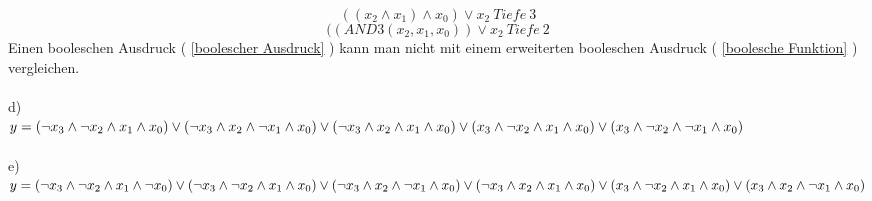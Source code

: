 \documentclass[11pt,a4paper]{article}
\begin{document}
\begin{equation}
\label{boolescher Ausdruck}
(( x_2 \wedge x_1 ) \wedge x_0 ) \vee x_2~Tiefe~3
\end{equation}
\begin{equation}
\label{boolesche Funktion}
((AND3(x_2,x_1,x_0))\vee x_2~Tiefe~2
\end{equation}
Einen booleschen Ausdruck ( \ref{boolescher Ausdruck} ) kann man nicht mit einem erweiterten booleschen Ausdruck  ( \ref{boolesche Funktion} ) vergleichen. \\ \\
d)\\
$
y=( \neg x_3 \wedge \neg x_2 \wedge x_1 \wedge x_0) \vee  ( \neg x_3 \wedge x_2 \wedge \neg x_1 \wedge x_0 ) \vee  ( \neg x_3 \wedge x_2 \wedge x_1 \wedge x_0  ) \vee \\
( x_3 \wedge \neg x_2 \wedge x_1 \wedge x_0 ) \vee ( x_3 \wedge \neg x_2 \wedge \neg x_1 \wedge x_0 )
$
\\ \\
e)\\
$
y=( \neg x_3 \wedge \neg x_2 \wedge x_1 \wedge \neg x_0 ) \vee ( \neg x_3 \wedge \neg x_2 \wedge x_1 \wedge x_0) \vee ( \neg x_3 \wedge x_2 \wedge \neg x_1 \wedge x_0) \vee \\ ( \neg x_3 \wedge x_2 \wedge x_1 \wedge x_0) \vee ( x_3 \wedge \neg x_2 \wedge x_1 \wedge x_0) \vee (x_3 \wedge x_2 \wedge \neg x_1 \wedge x_0)$
\end{document}
